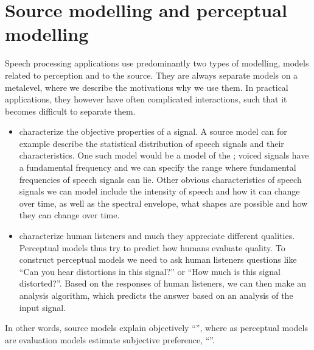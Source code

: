 \documentclass[letterpaper,10pt,english]{jupyterBook}
\begin{document}
\section{Source modelling and perceptual modelling}
\label{\detokenize{Modelling/Source_modelling_and_perceptual_modelling:source-modelling-and-perceptual-modelling}}\label{\detokenize{Modelling/Source_modelling_and_perceptual_modelling::doc}}
\sphinxAtStartPar
Speech processing applications use predominantly two types of modelling,
models related to perception and to the source. They are always separate
models on a meta\sphinxhyphen{}level, where we describe the motivations why we use
them. In practical applications, they however have often complicated
interactions, such that it becomes difficult to separate them.
\begin{itemize}
\item {} 
\sphinxAtStartPar
{} characterize the objective properties of a signal. A
source model can for example describe the statistical distribution
of speech signals and their characteristics. One such model would be
a model of the ;
voiced signals have a fundamental frequency and we can specify the
range where fundamental frequencies of speech signals can lie. Other
obvious characteristics of speech signals we can model include the
intensity of speech and how it can change over time, as well as the
spectral envelope, what shapes are possible and how they can change
over time.

\item {} 
\sphinxAtStartPar
{} characterize  human listeners 
and  much they appreciate different qualities. Perceptual
models thus try to predict how humans evaluate quality. To construct
perceptual models we need to ask human listeners questions like “Can
you hear distortions in this signal?” or “How much is this signal
distorted?”. Based on the responses of human listeners, we can then
make an analysis algorithm, which predicts the answer based on an
analysis of the input signal.

\end{itemize}

\sphinxAtStartPar
In other words, source models explain objectively “”, where as perceptual models are evaluation models estimate
subjective preference, “”.
\end{document}

